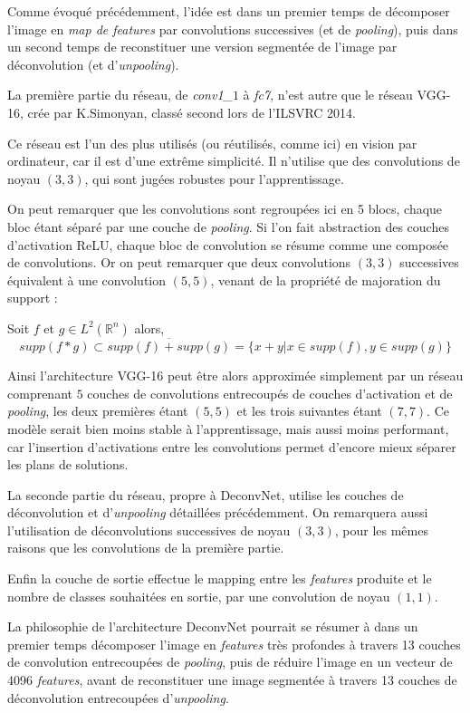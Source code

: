 \documentclass[a4paper, 11pt]{report}
\begin{document}
Comme évoqué précédemment, l'idée est dans un premier temps de décomposer l'image en \emph{map de features} par convolutions successives (et de \emph{pooling}), puis dans un second temps de reconstituer une version segmentée de l'image par déconvolution (et d'\emph{unpooling}).

La première partie du réseau, de \emph{conv1\_$1$} à \emph{fc7}, n'est autre que le réseau VGG-16, crée par K.Simonyan, classé second lors de l'ILSVRC 2014.

Ce réseau est l'un des plus utilisés (ou réutilisés, comme ici) en vision par ordinateur, car il est d'une extrême simplicité.
Il n'utilise que des convolutions de noyau $(3, 3)$, qui sont jugées robustes pour l'apprentissage.

On peut remarquer que les convolutions sont regroupées ici en 5 blocs, chaque bloc étant séparé par une couche de \emph{pooling}.
Si l'on fait abstraction des couches d'activation ReLU, chaque bloc de convolution se résume comme une composée de convolutions.
Or on peut remarquer que deux convolutions $(3, 3)$ successives équivalent à une convolution $(5, 5)$, venant de la propriété de majoration du support :

Soit $f$ et $g \in L^2(\mathbb{R}^n)$ alors,
$$supp(f * g) \subset \overline{supp(f) + supp(g)} = \{ x + y | x \in supp(f), y \in supp(g) \}$$

Ainsi l'architecture VGG-16 peut être alors approximée simplement par un réseau comprenant $5$ couches de convolutions entrecoupés de couches d'activation et de \emph{pooling}, les deux premières étant $(5,5)$ et les trois suivantes étant $(7,7)$.
Ce modèle serait bien moins stable à l'apprentissage, mais aussi moins performant, car l'insertion d'activations entre les convolutions permet d'encore mieux séparer les plans de solutions.

La seconde partie du réseau, propre à DeconvNet, utilise les couches de déconvolution et d'\emph{unpooling} détaillées précédemment. On remarquera aussi l'utilisation de déconvolutions successives de noyau $(3, 3)$, pour les mêmes raisons que les convolutions de la première partie.

Enfin la couche de sortie effectue le mapping entre les \emph{features} produite et le nombre de classes souhaitées en sortie, par une convolution de noyau $(1, 1)$.

La philosophie de l'architecture DeconvNet pourrait se résumer à dans un premier temps décomposer l'image en \emph{features} très profondes à travers 13 couches de convolution entrecoupées de \emph{pooling}, puis de réduire l'image en un vecteur de 4096 \emph{features}, avant de reconstituer une image segmentée à travers 13 couches de déconvolution entrecoupées d'\emph{unpooling}.
\end{document}
